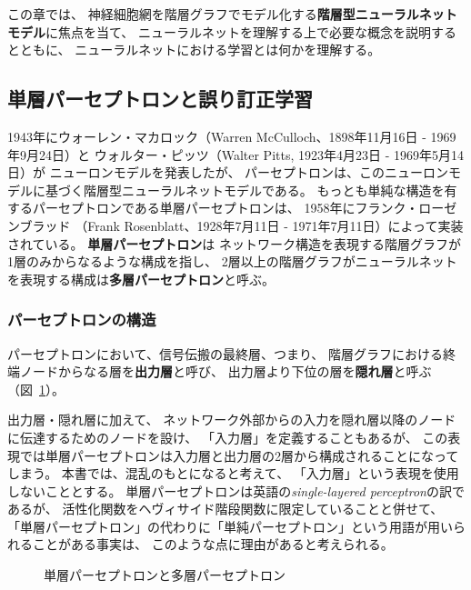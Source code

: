 この章では、
神経細胞網を階層グラフでモデル化する\textbf{階層型ニューラルネットモデル}に焦点を当て、
ニューラルネットを理解する上で必要な概念を説明するとともに、
ニューラルネットにおける学習とは何かを理解する。

\subsection{単層パーセプトロンと誤り訂正学習}
\label{sec:perceptron}


1943年にウォーレン・マカロック（Warren McCulloch、1898年11月16日 - 1969年9月24日）と
ウォルター・ピッツ（Walter Pitts, 1923年4月23日 - 1969年5月14日）が
ニューロンモデルを発表したが、
パーセプトロンは、このニューロンモデルに基づく階層型ニューラルネットモデルである。
もっとも単純な構造を有するパーセプトロンである単層パーセプトロンは、
1958年にフランク・ローゼンブラッド
（Frank Rosenblatt、1928年7月11日 - 1971年7月11日）によって実装されている。
\textbf{単層パーセプトロン}は
ネットワーク構造を表現する階層グラフが1層のみからなるような構成を指し、
2層以上の階層グラフがニューラルネットを表現する構成は\textbf{多層パーセプトロン}と呼ぶ。

\subsubsection{パーセプトロンの構造}

\label{sec:structure-perceptron}

パーセプトロンにおいて、信号伝搬の最終層、つまり、
階層グラフにおける終端ノードからなる層を\textbf{出力層}と呼び、
出力層より下位の層を\textbf{隠れ層}と呼ぶ
（図~\ref{fig:perceptron}）。

出力層・隠れ層に加えて、
ネットワーク外部からの入力を隠れ層以降のノードに伝達するためのノードを設け、
「入力層」を定義することもあるが、
この表現では単層パーセプトロンは入力層と出力層の2層から構成されることになってしまう。
本書では、混乱のもとになると考えて、
「入力層」という表現を使用しないこととする。
単層パーセプトロンは英語の\emph{single-layered perceptron}の訳であるが、
活性化関数をヘヴィサイド階段関数に限定していることと併せて、
「単層パーセプトロン」の代わりに「単純パーセプトロン」という用語が用いられることがある事実は、
このような点に理由があると考えられる。

\begin{figure}
  \centering
  
  \caption{単層パーセプトロンと多層パーセプトロン}
  \label{fig:perceptron}
\end{figure}

